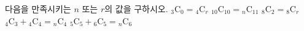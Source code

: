 다음을 만족시키는 $n$ 또는 $r$의 값을 구하시오.
 ${}_3\mathrm{C}_0={}_4\mathrm{C}_r$
 ${}_{10}\mathrm{C}_{10}={}_n\mathrm{C}_{11}$
 ${}_8\mathrm{C}_2={}_8\mathrm{C}_r$ 
 ${}_4\mathrm{C}_3+{}_4\mathrm{C}_4={}_n\mathrm{C}_4$
 ${}_5\mathrm{C}_5+{}_6\mathrm{C}_5={}_n\mathrm{C}_6$
